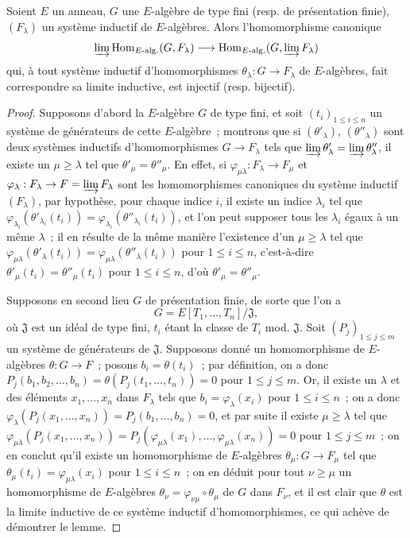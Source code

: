 \begin{lemma}[8.8.2.3]
\label{IV.8.8.2.3-fr}
Soient $E$ un anneau, $G$ une $E$-algèbre de type fini \textup{(resp.} de présentation
finie\textup{)}, $(F_\lambda)$ un système inductif de $E$-algèbres. Alors
l'homomorphisme canonique
\[
\varinjlim\operatorname{Hom}_{E\textup{-alg.}}(G,F_\lambda)
\longrightarrow
\operatorname{Hom}_{E\textup{-alg.}}(G,\varinjlim F_\lambda)
\]
qui, à tout système inductif d'homomorphismes
$\theta_\lambda:G\to F_\lambda$ de $E$-algèbres, fait correspondre sa limite
inductive, est injectif \textup{(resp.} bijectif\textup{)}.
\end{lemma}

\begin{proof}
Supposons d'abord la $E$-algèbre $G$ de type fini, et soit
$(t_i)_{1\leq i\leq n}$ un système de générateurs de cette $E$-algèbre~;
montrons que si $(\theta'_\lambda)$, $(\theta''_\lambda)$ sont deux systèmes
inductifs d'homomorphismes $G\to F_\lambda$ tels que
$\varinjlim\theta'_\lambda=\varinjlim\theta''_\lambda$, il existe un
$\mu\geq\lambda$ tel que $\theta'_\mu=\theta''_\mu$. En effet, si
$\varphi_{\mu\lambda}:F_\lambda\to F_\mu$ et
$\varphi_\lambda:F_\lambda\to F=\varinjlim F_\lambda$ sont les
homomorphismes canoniques du système inductif $(F_\lambda)$, par hypothèse,
pour chaque indice $i$, il existe un indice $\lambda_i$ tel que
$\varphi_{\lambda_i}(\theta'_{\lambda_i}(t_i))=
\varphi_{\lambda_i}(\theta''_{\lambda_i}(t_i))$, et l'on peut supposer tous
les $\lambda_i$ égaux à un même $\lambda$~; il en résulte de la même manière
l'existence d'un $\mu\geq\lambda$ tel que
$\varphi_{\mu\lambda}(\theta'_\lambda(t_i))=
\varphi_{\mu\lambda}(\theta''_\lambda(t_i))$ pour $1\leq i\leq n$,
c'est-à-dire $\theta'_\mu(t_i)=\theta''_\mu(t_i)$ pour $1\leq i\leq n$,
d'où $\theta'_\mu=\theta''_\mu$.

Supposons en second lieu $G$ de présentation finie, de sorte que l'on a
\[
G=E[T_1,\ldots,T_n]/\mathfrak J,
\]
où $\mathfrak J$ est un idéal de type fini, $t_i$ étant la classe de $T_i$
mod. $\mathfrak J$. Soit $(P_j)_{1\leq j\leq m}$ un système de générateurs de
$\mathfrak J$. Supposons donné un homomorphisme de $E$-algèbres
$\theta:G\to F$~; posons $b_i=\theta(t_i)$~; par définition, on a donc
$P_j(b_1,b_2,\ldots,b_n)=\theta(P_j(t_1,\ldots,t_n))=0$ pour
$1\leq j\leq m$. Or, il existe un $\lambda$ et des éléments
$x_1,\ldots,x_n$ dans $F_\lambda$ tels que $b_i=\varphi_\lambda(x_i)$ pour
$1\leq i\leq n$~; on a donc
$\varphi_\lambda(P_j(x_1,\ldots,x_n))=P_j(b_1,\ldots,b_n)=0$, et par suite il
existe $\mu\geq\lambda$ tel que
$\varphi_{\mu\lambda}(P_j(x_1,\ldots,x_n))=
P_j(\varphi_{\mu\lambda}(x_1),\ldots,\varphi_{\mu\lambda}(x_n))=0$ pour
$1\leq j\leq m$~; on en conclut qu'il existe un homomorphisme de
$E$-algèbres $\theta_\mu:G\to F_\mu$ tel que
$\theta_\mu(t_i)=\varphi_{\mu\lambda}(x_i)$
pour $1\leq i\leq n$~; on en déduit pour tout $\nu\geq\mu$ un
homomorphisme de $E$-algèbres
$\theta_\nu=\varphi_{\nu\mu}\circ\theta_\mu$ de $G$ dans $F_\nu$, et il est
clair que $\theta$ est la limite inductive de ce système inductif
d'homomorphismes, ce qui achève de démontrer le lemme.


\end{proof}

